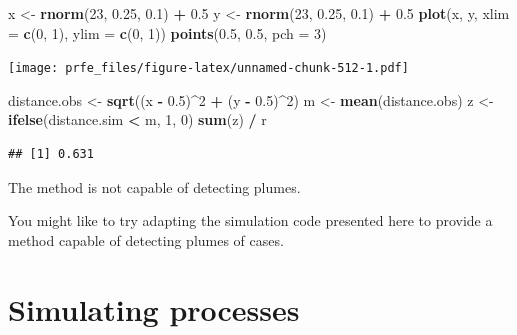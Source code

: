 \documentclass[12pt,a4paper]{book}
\newenvironment{Shaded}{\begin{snugshade}}{\end{snugshade}}
\newcommand{\DataTypeTok}[1]{\textcolor[rgb]{0.13,0.29,0.53}{#1}}
\newcommand{\DecValTok}[1]{\textcolor[rgb]{0.00,0.00,0.81}{#1}}
\newcommand{\FloatTok}[1]{\textcolor[rgb]{0.00,0.00,0.81}{#1}}
\newcommand{\KeywordTok}[1]{\textcolor[rgb]{0.13,0.29,0.53}{\textbf{#1}}}
\newcommand{\NormalTok}[1]{#1}
\newcommand{\OperatorTok}[1]{\textcolor[rgb]{0.81,0.36,0.00}{\textbf{#1}}}
\newcommand{\StringTok}[1]{\textcolor[rgb]{0.31,0.60,0.02}{#1}}
\theoremstyle{definition}
\theoremstyle{definition}
\theoremstyle{definition}
\theoremstyle{remark}
\begin{document}
\begin{Shaded}
\begin{Highlighting}[]
\NormalTok{x <-}\StringTok{ }\KeywordTok{rnorm}\NormalTok{(}\DecValTok{23}\NormalTok{, }\FloatTok{0.25}\NormalTok{, }\FloatTok{0.1}\NormalTok{) }\OperatorTok{+}\StringTok{ }\FloatTok{0.5}
\NormalTok{y <-}\StringTok{ }\KeywordTok{rnorm}\NormalTok{(}\DecValTok{23}\NormalTok{, }\FloatTok{0.25}\NormalTok{, }\FloatTok{0.1}\NormalTok{) }\OperatorTok{+}\StringTok{ }\FloatTok{0.5}
\KeywordTok{plot}\NormalTok{(x, y, }\DataTypeTok{xlim =} \KeywordTok{c}\NormalTok{(}\DecValTok{0}\NormalTok{, }\DecValTok{1}\NormalTok{), }\DataTypeTok{ylim =} \KeywordTok{c}\NormalTok{(}\DecValTok{0}\NormalTok{, }\DecValTok{1}\NormalTok{))}
\KeywordTok{points}\NormalTok{(}\FloatTok{0.5}\NormalTok{, }\FloatTok{0.5}\NormalTok{, }\DataTypeTok{pch =} \DecValTok{3}\NormalTok{)}
\end{Highlighting}
\end{Shaded}

\texttt{[image: prfe\_files/figure-latex/unnamed-chunk-512-1.pdf]}

\begin{Shaded}
\begin{Highlighting}[]
\NormalTok{distance.obs <-}\StringTok{ }\KeywordTok{sqrt}\NormalTok{((x }\OperatorTok{-}\StringTok{ }\FloatTok{0.5}\NormalTok{)}\OperatorTok{^}\DecValTok{2} \OperatorTok{+}\StringTok{ }\NormalTok{(y }\OperatorTok{-}\StringTok{ }\FloatTok{0.5}\NormalTok{)}\OperatorTok{^}\DecValTok{2}\NormalTok{)}
\NormalTok{m <-}\StringTok{ }\KeywordTok{mean}\NormalTok{(distance.obs)}
\NormalTok{z <-}\StringTok{ }\KeywordTok{ifelse}\NormalTok{(distance.sim }\OperatorTok{<}\StringTok{ }\NormalTok{m, }\DecValTok{1}\NormalTok{, }\DecValTok{0}\NormalTok{)}
\KeywordTok{sum}\NormalTok{(z) }\OperatorTok{/}\StringTok{ }\NormalTok{r}
\end{Highlighting}
\end{Shaded}

\begin{verbatim}
## [1] 0.631
\end{verbatim}

The method is not capable of detecting plumes.

You might like to try adapting the simulation code presented here to
provide a method capable of detecting plumes of cases.

\hypertarget{simulating-processes}{%
\section{Simulating processes}\label{simulating-processes}}
\end{document}
